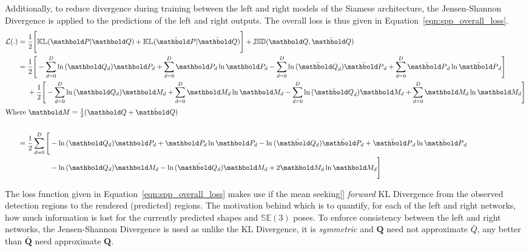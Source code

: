 Additionally, to reduce divergence during training between the left and right models of the Siamese 
architecture, the Jensen-Shannon Divergence is applied to the predictions of the left and right outputs.
The overall loss is thus given in Equation~\ref{eqn:spp_overall_loss}.
\begin{align}
  \label{eqn:spp_overall_loss}
  \mathcal{L}(.) &{}= \frac{1}{2} \Bigg[
    \mathbb{KL}(\bm{P} \vert \bm{Q}) + \mathbb{KL}(\bar{\bm{P}} \vert \bar{\bm{Q}})
  \Bigg]
  + \mathbb{JSD}(\bm{Q}, \bar{\bm{Q}})\\
  &{}= 
  \begin{aligned}[t]
    {}& \frac{1}{2} \Bigg[
      -\sum_{d = 0}^{D} \ln{(\bm{Q}_{d})}\bm{P}_{d} + \sum_{d = 0}^{D} \bm{P}_{d}\ln{\bm{P}_{d}}
      -\sum_{d = 0}^{D} \ln{(\bar{\bm{Q}}_{d})}\bar{\bm{P}}_{d} + \sum_{d = 0}^{D} \bar{\bm{P}}_{d}\ln{\bar{\bm{P}}_{d}}
    \Bigg]\\
    {}& + \frac{1}{2} \Bigg[
      -\sum_{d = 0}^{D} \ln{(\bm{Q}_{d})}\bm{M}_{d} + \sum_{d = 0}^{D} \bm{M}_{d}\ln{\bm{M}_{d}}
      -\sum_{d = 0}^{D} \ln{(\bar{\bm{Q}}_{d})}\bm{M}_{d} + \sum_{d = 0}^{D} \bm{M}_{d}\ln{\bm{M}_{d}}
    \Bigg]
  \end{aligned}\\
  \shortintertext{Where \( \bm{M} = \frac{1}{2} (\bm{Q} + \bar{\bm{Q}}) \)}\\
  {}&= \frac{1}{2} \sum_{d = 0}^{D}
    \begin{aligned}[t]
    \Bigg[ {}&
    -\ln{(\bm{Q}_{d})}\bm{P}_{d} + \bm{P}_{d}\ln{\bm{P}_{d}}
    -\ln{(\bar{\bm{Q}_{d}})}\bar{\bm{P}_{d}} + \bar{\bm{P}}_{d}\ln{\bar{\bm{P}}_{d}}\\
    {}& -\ln{(\bm{Q}_{d})}\bm{M}_{d} -\ln{(\bar{\bm{Q}_{d}})}\bm{M}_{d} + 2\bm{M}_{d}\ln{\bm{M}_{d}}
    \Bigg]
    \end{aligned}
\end{align}

The loss function given in Equation~\ref{eqn:spp_overall_loss} makes use if the mean seeking\ref{} 
\textit{forward} KL Divergence from the observed detection regions to the rendered (predicted) 
regions. The motivation behind which is to quantify, for each of the left and right networks, how 
much information is lost for the currently predicted shapes and \( \mathbb{SE}(3) \) poses. To 
enforce consistency between the left and right networks, the Jensen-Shannon Divergence is used as 
unlike the KL Divergence, it is \textit{symmetric} and \( \bm{Q} \) need not approximate \( \bar{Q} \), 
any better than \( \bar{\bm{Q}} \) need approximate \( \bm{Q} \).

